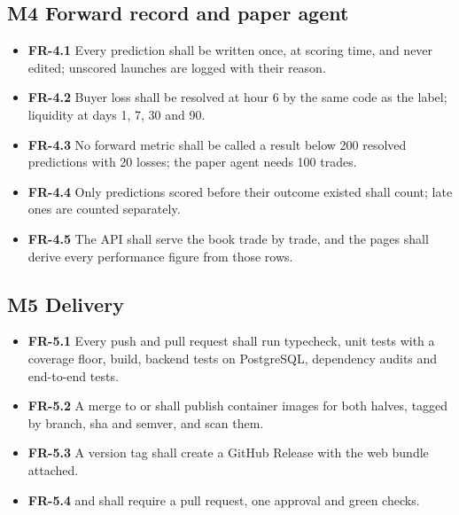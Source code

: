 \subsection{M4 Forward record and paper agent}
\begin{itemize}[label={}]
  \item \textbf{FR-4.1} Every prediction shall be written once, at scoring time, and never edited; unscored launches are logged with their reason.
  \item \textbf{FR-4.2} Buyer loss shall be resolved at hour 6 by the same code as the label; liquidity at days 1, 7, 30 and 90.
  \item \textbf{FR-4.3} No forward metric shall be called a result below 200 resolved predictions with 20 losses; the paper agent needs 100 trades.
  \item \textbf{FR-4.4} Only predictions scored before their outcome existed shall count; late ones are counted separately.
  \item \textbf{FR-4.5} The API shall serve the book trade by trade, and the pages shall derive every performance figure from those rows.
\end{itemize}
\subsection{M5 Delivery}
\begin{itemize}[label={}]
  \item \textbf{FR-5.1} Every push and pull request shall run typecheck, unit tests with a coverage floor, build, backend tests on PostgreSQL, dependency audits and end-to-end tests.
  \item \textbf{FR-5.2} A merge to  or  shall publish container images for both halves, tagged by branch, sha and semver, and scan them.
  \item \textbf{FR-5.3} A version tag shall create a GitHub Release with the web bundle attached.
  \item \textbf{FR-5.4}  and  shall require a pull request, one approval and green checks.
\end{itemize}
